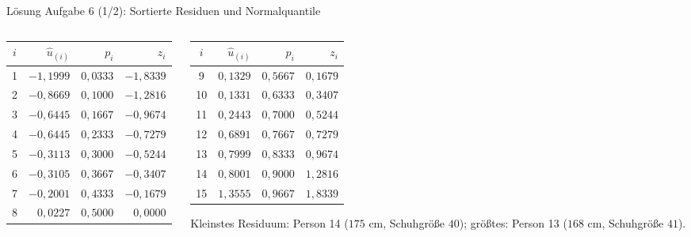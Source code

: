 \documentclass[aspectratio=169,11pt]{beamer}
\begin{document}
\begin{frame}{Lösung Aufgabe 6 (1/2): Sortierte Residuen und Normalquantile}
  \begin{columns}[T]
    \begin{column}{0.49\textwidth}
      \begin{center}
        \small
        \renewcommand{\arraystretch}{1.08}
        \begin{tabular}{c r r r}
          \toprule
          $i$ & $\hat{u}_{(i)}$ & $p_i$ & $z_i$ \\
          \midrule
          1 & $-1{,}1999$ & $0{,}0333$ & $-1{,}8339$ \\
          2 & $-0{,}8669$ & $0{,}1000$ & $-1{,}2816$ \\
          3 & $-0{,}6445$ & $0{,}1667$ & $-0{,}9674$ \\
          4 & $-0{,}6445$ & $0{,}2333$ & $-0{,}7279$ \\
          5 & $-0{,}3113$ & $0{,}3000$ & $-0{,}5244$ \\
          6 & $-0{,}3105$ & $0{,}3667$ & $-0{,}3407$ \\
          7 & $-0{,}2001$ & $0{,}4333$ & $-0{,}1679$ \\
          8 & $0{,}0227$  & $0{,}5000$ & $0{,}0000$ \\
          \bottomrule
        \end{tabular}
      \end{center}
    \end{column}
    \begin{column}{0.49\textwidth}
      \begin{center}
        \small
        \renewcommand{\arraystretch}{1.08}
        \begin{tabular}{c r r r}
          \toprule
          $i$ & $\hat{u}_{(i)}$ & $p_i$ & $z_i$ \\
          \midrule
          9  & $0{,}1329$ & $0{,}5667$ & $0{,}1679$ \\
          10 & $0{,}1331$ & $0{,}6333$ & $0{,}3407$ \\
          11 & $0{,}2443$ & $0{,}7000$ & $0{,}5244$ \\
          12 & $0{,}6891$ & $0{,}7667$ & $0{,}7279$ \\
          13 & $0{,}7999$ & $0{,}8333$ & $0{,}9674$ \\
          14 & $0{,}8001$ & $0{,}9000$ & $1{,}2816$ \\
          15 & $1{,}3555$ & $0{,}9667$ & $1{,}8339$ \\
          \bottomrule
        \end{tabular}
      \end{center}
      \footnotesize Kleinstes Residuum: Person 14 ($175$ cm, Schuhgröße $40$);
      größtes: Person 13 ($168$ cm, Schuhgröße $41$).
    \end{column}
  \end{columns}
\end{frame}
\end{document}
